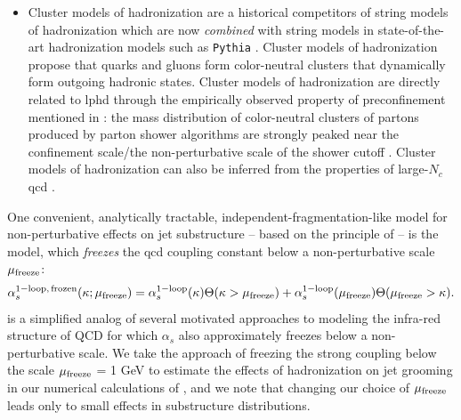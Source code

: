 \begin{subappendices}
\begin{itemize}
    \item

        Cluster models of hadronization are a historical competitors of string models of hadronization which are now \textit{combined} with string models in state-of-the-art hadronization models such as \texttt{Pythia} \cite{Bierlich:2022pfr}.
        Cluster models of hadronization propose that quarks and gluons form color-neutral clusters that dynamically form outgoing hadronic states.
        Cluster models of hadronization are directly related to \gls{lphd} through the empirically observed property of \gls{preconfinement} mentioned in :
        the mass distribution of color-neutral clusters of partons produced by parton shower algorithms are strongly peaked near the confinement scale/the non-perturbative scale of the shower cutoff \cite{Amati:1979fg,Bassetto:1979vy,Bertolini:1982em,Odagiri:2003ni}.
        Cluster models of hadronization can also be inferred from the properties of large-\(N_c\) \gls{qcd} \cite{Hoche:2014rga}.
\end{itemize}

One convenient, analytically tractable, independent-fragmentation-like model for non-perturbative effects on jet substructure -- based on the principle of  -- is the  model, which \textit{freezes} the \gls{qcd} coupling constant below a non-perturbative scale \(\mu_{\rm freeze}\):
\begin{align}
    \alpha^{\rm 1-loop,\,frozen}_s(\kappa; \mu_{\rm freeze})
    =
    \alpha^{\rm 1-loop}_s(\kappa)
    \Theta(\kappa > \mu_{\rm freeze})
    +
    \alpha^{\rm 1-loop}_s(\mu_{\rm freeze})
    \Theta(\mu_{\rm freeze} > \kappa)
    .
    \label{eq:frozen-coupling}
\end{align}
%
 is a simplified analog of several motivated approaches to modeling the infra-red structure of QCD for which \(\alpha_s\) also approximately freezes below a non-perturbative scale.
%
We take the approach of freezing the strong coupling below the scale \(\mu_{\rm freeze}\) = 1 GeV to estimate the effects of hadronization on jet grooming in our numerical calculations of , and we note that changing our choice of \(\mu_{\rm freeze}\) leads only to small effects in substructure distributions.



\end{subappendices}
